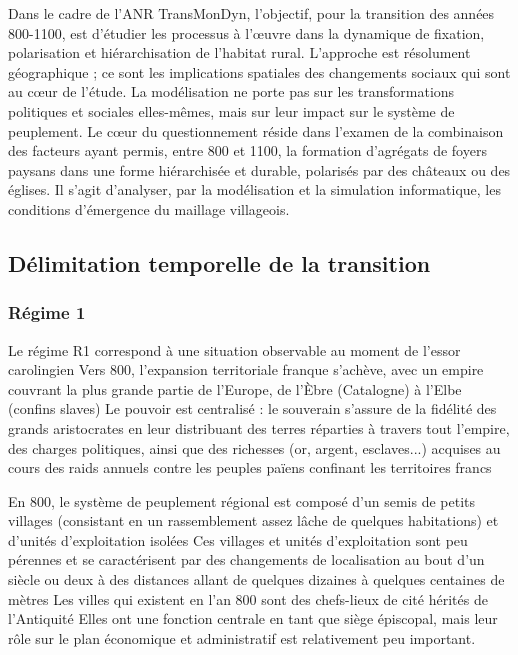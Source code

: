 \documentclass[12pt, a4paper, oneside]{book}
\begin{document}
	Dans le cadre de l'ANR TransMonDyn, l'objectif, pour la transition des années 800-1100, est d'étudier les processus à l'œuvre dans la dynamique de fixation, polarisation et hiérarchisation de l'habitat rural.
	L'approche est résolument géographique ; ce sont les implications spatiales des changements sociaux qui sont au cœur de l'étude.
	La modélisation ne porte pas sur les transformations politiques et sociales elles-mêmes, mais sur leur impact sur le système de peuplement.
	Le cœur du questionnement réside dans l'examen de la combinaison des facteurs ayant permis, entre 800 et 1100, la formation d'agrégats de foyers paysans dans une forme hiérarchisée et durable, polarisés par des châteaux ou des églises.
	Il s'agit d'analyser, par la modélisation et la simulation informatique, les conditions d'émergence du maillage villageois.
	
	\subsection{Délimitation temporelle de la transition}
	
	\subsubsection{Régime 1}
	
	Le régime R1 correspond à une situation observable au moment de l'essor carolingien
	Vers 800, l'expansion territoriale franque s'achève, avec un empire couvrant la plus grande partie de l'Europe, de l'Èbre (Catalogne) à l'Elbe (confins slaves)
	Le pouvoir est centralisé : le souverain s'assure de la fidélité des grands aristocrates en leur distribuant des terres réparties à travers tout l'empire, des charges politiques, ainsi que des richesses (or, argent, esclaves...) acquises au cours des raids annuels contre les peuples païens confinant les territoires francs
	
	En 800, le système de peuplement régional est composé d'un semis de petits villages (consistant en un rassemblement assez lâche de quelques habitations) et d'unités d'exploitation isolées
	Ces villages et unités d'exploitation sont peu pérennes et se caractérisent par des changements de localisation au bout d'un siècle ou deux à des distances allant de quelques dizaines à quelques centaines de mètres
	Les villes qui existent en l'an 800 sont des chefs-lieux de cité hérités de l'Antiquité
	Elles ont une fonction centrale en tant que siège épiscopal, mais leur rôle sur le plan économique et administratif est relativement peu important.
	
\end{document}

